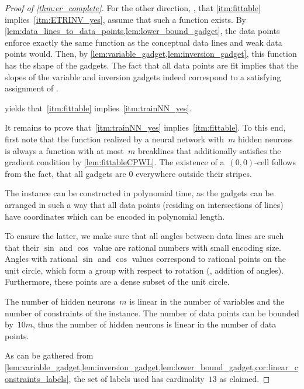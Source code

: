 \begin{proof}[Proof of \cref{thm:er_complete}]
    For the other direction, \ie, that \ref{itm:fittable} implies~\ref{itm:ETRINV_yes}, assume that such a \CPWL function exists.
    By \cref{lem:data_lines_to_data_points,lem:lower_bound_gadget}, the data points enforce exactly the same \CPWL function as the conceptual data lines and weak data points would.
    Then, by \cref{lem:variable_gadget,lem:inversion_gadget}, this \CPWL function has the shape of the gadgets.
    The fact that all data points are fit implies that the slopes of the variable and inversion gadgets indeed correspond to a satisfying assignment of \ETRINV.

     yields that~\ref{itm:fittable} implies~\ref{itm:trainNN_yes}.

    It remains to prove that~\ref{itm:trainNN_yes} implies~\ref{itm:fittable}.
    To this end, first note that the function realized by a \fullyconnected \twolayer neural network with~$m$ hidden \ReLU neurons is always a \CPWL function with at most~$m$ breaklines that additionally satisfies the gradient condition by \cref{lem:fittableCPWL}.
    The existence of a~$(0,0)$-cell follows from the fact, that all gadgets are
%
$0$ everywhere  %
outside their stripes.

    \medskip
    \noindent
    The \trainNN instance can be constructed in polynomial time, as the gadgets can be arranged in such a way that all data points (residing on intersections of lines) have coordinates which can be encoded in polynomial length.

    To ensure the latter, we make sure that all angles between data lines are such that their $\sin$ and $\cos$ value are rational numbers with small encoding size.
    Angles with rational $\sin$ and $\cos$ values correspond to rational points on the unit circle, which form a group with respect to rotation (\ie, addition of angles). 
    Furthermore, these points are a dense subset of the unit circle.

    The number of hidden neurons~$m$ is linear in the number of variables and the number of constraints of the \ETRINV instance.
    The number of data points can be bounded by~$10m$, thus the number of hidden neurons is linear in the number of data points.

    As can be gathered from \cref{lem:variable_gadget,lem:inversion_gadget,lem:lower_bound_gadget,cor:linear_constraints_labels}, the set of %
labels used  %
has cardinality~$13$ as claimed.
\end{proof}

